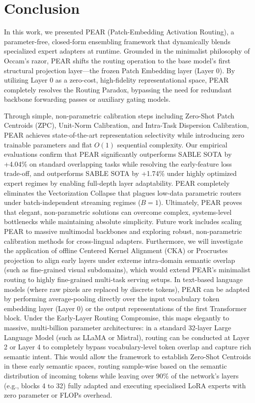 \section{Conclusion}
\label{sec:conclusion}

In this work, we presented PEAR (Patch-Embedding Activation Routing), a parameter-free, closed-form ensembling framework that dynamically blends specialized expert adapters at runtime. Grounded in the minimalist philosophy of Occam's razor, PEAR shifts the routing operation to the base model's first structural projection layer---the frozen Patch Embedding layer (Layer 0). By utilizing Layer 0 as a zero-cost, high-fidelity representational space, PEAR completely resolves the Routing Paradox, bypassing the need for redundant backbone forwarding passes or auxiliary gating models. 

Through simple, non-parametric calibration steps including Zero-Shot Patch Centroids (ZPC), Unit-Norm Calibration, and Intra-Task Dispersion Calibration, PEAR achieves state-of-the-art representation selectivity while introducing zero trainable parameters and flat $O(1)$ sequential complexity. Our empirical evaluations confirm that PEAR significantly outperforms SABLE SOTA by +4.04\% on standard overlapping tasks while resolving the early-feature loss trade-off, and outperforms SABLE SOTA by +1.74\% under highly optimized expert regimes by enabling full-depth layer adaptability. PEAR completely eliminates the Vectorization Collapse that plagues low-data parametric routers under batch-independent streaming regimes ($B=1$). Ultimately, PEAR proves that elegant, non-parametric solutions can overcome complex, systems-level bottlenecks while maintaining absolute simplicity. Future work includes scaling PEAR to massive multimodal backbones and exploring robust, non-parametric calibration methods for cross-lingual adapters. Furthermore, we will investigate the application of offline Centered Kernel Alignment (CKA) or Procrustes projection to align early layers under extreme intra-domain semantic overlap (such as fine-grained visual subdomains), which would extend PEAR's minimalist routing to highly fine-grained multi-task serving setups. In text-based language models (where raw pixels are replaced by discrete tokens), PEAR can be adapted by performing average-pooling directly over the input vocabulary token embedding layer (Layer 0) or the output representations of the first Transformer block. Under the Early-Layer Routing Compromise, this maps elegantly to massive, multi-billion parameter architectures: in a standard 32-layer Large Language Model (such as LLaMA or Mistral), routing can be conducted at Layer 2 or Layer 4 to completely bypass vocabulary-level token overlap and capture rich semantic intent. This would allow the framework to establish Zero-Shot Centroids in these early semantic spaces, routing sample-wise based on the semantic distribution of incoming tokens while leaving over 90\% of the network's layers (e.g., blocks 4 to 32) fully adapted and executing specialised LoRA experts with zero parameter or FLOPs overhead.
